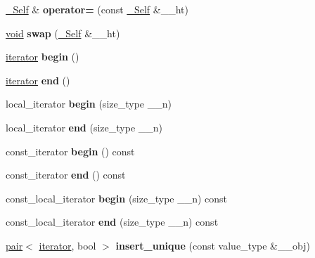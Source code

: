 \begin{DoxyCompactItemize}
\hyperlink{classhashtable}{\+\_\+\+Self} \& {\bfseries operator=} (const \hyperlink{classhashtable}{\+\_\+\+Self} \&\+\_\+\+\_\+ht)
\item 
\mbox{\label{classhashtable_ab73a15778f2fbc33d6e2d47579184be3}} 
\hyperlink{interfacevoid}{void} {\bfseries swap} (\hyperlink{classhashtable}{\+\_\+\+Self} \&\+\_\+\+\_\+ht)
\item 
\mbox{\label{classhashtable_ace3659f5a29b5abbeead961f612563f0}} 
\hyperlink{structiterator}{iterator} {\bfseries begin} ()
\item 
\mbox{\label{classhashtable_a64bdf03e3603bb6eee9efce674181551}} 
\hyperlink{structiterator}{iterator} {\bfseries end} ()
\item 
\mbox{\label{classhashtable_a0883733b4a6d726b45fd46ad4bd3220d}} 
local\+\_\+iterator {\bfseries begin} (size\+\_\+type \+\_\+\+\_\+n)
\item 
\mbox{\label{classhashtable_a4ca2e142f5c179e68280932e5a12f6b4}} 
local\+\_\+iterator {\bfseries end} (size\+\_\+type \+\_\+\+\_\+n)
\item 
\mbox{\label{classhashtable_a5be315ba535c6de11db51430e6ad6438}} 
const\+\_\+iterator {\bfseries begin} () const
\item 
\mbox{\label{classhashtable_ab512801a294cadc9c1ded6f6f2b2af9c}} 
const\+\_\+iterator {\bfseries end} () const
\item 
\mbox{\label{classhashtable_a1a6f8cabb0f91889e8e095913348b8dd}} 
const\+\_\+local\+\_\+iterator {\bfseries begin} (size\+\_\+type \+\_\+\+\_\+n) const
\item 
\mbox{\label{classhashtable_ac868c2ca569627372817ec2f261df4a9}} 
const\+\_\+local\+\_\+iterator {\bfseries end} (size\+\_\+type \+\_\+\+\_\+n) const
\item 
\mbox{\label{classhashtable_a3001b32bbe1999b16e7b2b7c1890ac79}} 
\hyperlink{structpair}{pair}$<$ \hyperlink{structiterator}{iterator}, bool $>$ {\bfseries insert\+\_\+unique} (const value\+\_\+type \&\+\_\+\+\_\+obj)

\end{DoxyCompactItemize}
